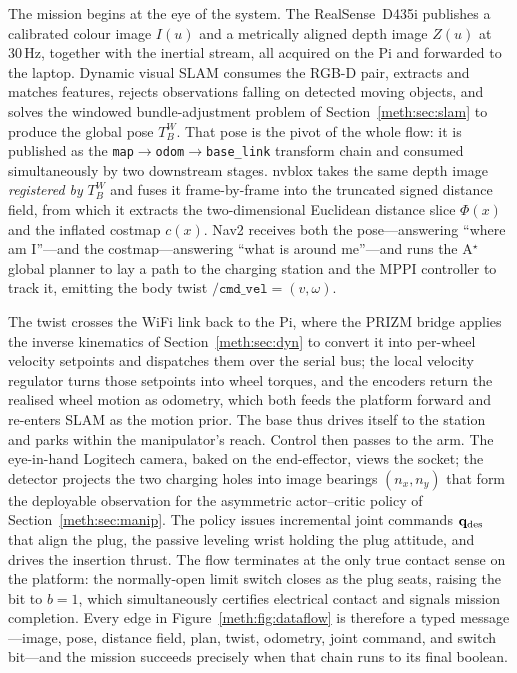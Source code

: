 The mission begins at the eye of the system. The RealSense~D435i publishes a calibrated colour image $I(u)$ and a metrically aligned depth image $Z(u)$ at \ensuremath{30\,\mathrm{Hz}}, together with the inertial stream, all acquired on the Pi and forwarded to the laptop. Dynamic visual SLAM consumes the RGB-D pair, extracts and matches features, rejects observations falling on detected moving objects, and solves the windowed bundle-adjustment problem of Section~\ref{meth:sec:slam} to produce the global pose $T^{W}_{B}$. That pose is the pivot of the whole flow: it is published as the \texttt{map}$\to$\texttt{odom}$\to$\texttt{base\_link} transform chain and consumed simultaneously by two downstream stages. nvblox takes the same depth image \emph{registered by} $T^{W}_{B}$ and fuses it frame-by-frame into the truncated signed distance field, from which it extracts the two-dimensional Euclidean distance slice $\Phi(x)$ and the inflated costmap $c(x)$. Nav2 receives both the pose---answering ``where am I''---and the costmap---answering ``what is around me''---and runs the A$^\star$ global planner to lay a path to the charging station and the MPPI controller to track it, emitting the body twist $\texttt{/cmd\_vel}=(v,\omega)$.

The twist crosses the WiFi link back to the Pi, where the PRIZM bridge applies the inverse kinematics of Section~\ref{meth:sec:dyn} to convert it into per-wheel velocity setpoints and dispatches them over the serial bus; the local velocity regulator turns those setpoints into wheel torques, and the encoders return the realised wheel motion as odometry, which both feeds the platform forward and re-enters SLAM as the motion prior. The base thus drives itself to the station and parks within the manipulator's reach. Control then passes to the arm. The eye-in-hand Logitech camera, baked on the end-effector, views the socket; the detector projects the two charging holes into image bearings $(n_x,n_y)$ that form the deployable observation for the asymmetric actor--critic policy of Section~\ref{meth:sec:manip}. The policy issues incremental joint commands $\mathbf{q}_{\mathrm{des}}$ that align the plug, the passive leveling wrist holding the plug attitude, and drives the insertion thrust. The flow terminates at the only true contact sense on the platform: the normally-open limit switch closes as the plug seats, raising the bit to $b=1$, which simultaneously certifies electrical contact and signals mission completion. Every edge in Figure~\ref{meth:fig:dataflow} is therefore a typed message---image, pose, distance field, plan, twist, odometry, joint command, and switch bit---and the mission succeeds precisely when that chain runs to its final boolean.

